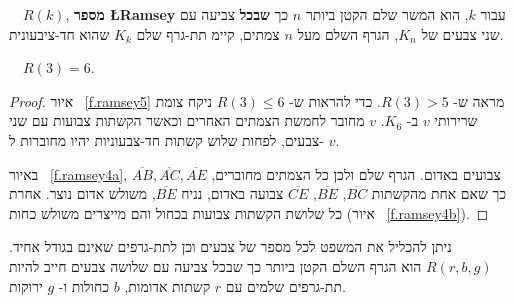 \begin{definition}
$\quad R(k)$,
\textbf{מספר
\L{Ramsey}}
עבור 
$k$,
הוא המשר שלם הקטן ביותר 
$n$
כך 
\textbf{שבכל}
צביעה עם שני צבעים של
$K_{n}$,
הגרף השלם מעל 
$n$
צמתים, קיימ תת-גרף שלם 
$K_k$
שהוא חד-ציבעונית.
\end{definition}
\begin{theorem}[\L{Ramsey}]
$\quad R(3)=6$.\label{thm.ramsey}
\end{theorem}

\begin{proof}
איור%
~\ref{f.ramsey5}
מראה ש-%
$R(3)>5$.
כדי להראות ש-%
$R(3)\leq 6$
ניקח צומת שרירותי 
$v$
ב-%
$K_6$.
$v$
מחובר לחמשת הצמתים האחרים וכאשר הקשתות צבועות עם שני צבעים, לפחות שלוש קשתות חד-צבעוניות יהיו מחוברות ל-%
$v$. 

באיור%
~\ref{f.ramsey4a}, $\overline{AB}, \overline{AC}, \overline{AE}$ 
צבועים באדום. הגרף שלם ולכן כל הצמתים מחוברים, כך שאם אחת מהקשתות 
$\overline{BC}$, $\overline{BE}$, $\overline{CE}$
צבועה באדום, נניח
$\overline{BE}$,
משולש אדום נוצר. אחרת כל שלושת הקשתות צבועות בכחול והם מייצרים משולש כחות (איור%
~\ref{f.ramsey4b}).
\end{proof}

ניתן להכליל את המשפט לכל מספר של צבעים וכן לתת-גרפים שאינם בגודל אחיד. 
$R(r,b,g)$
הוא הגרף השלם הקטן ביותר כך שבכל צביעה עם שלושה צבעים חייב להיות תת-גרפים שלמים עם 
$r$
קשתות אדומות, 
$b$
כחולות ו-%
$g$
ירוקות.

